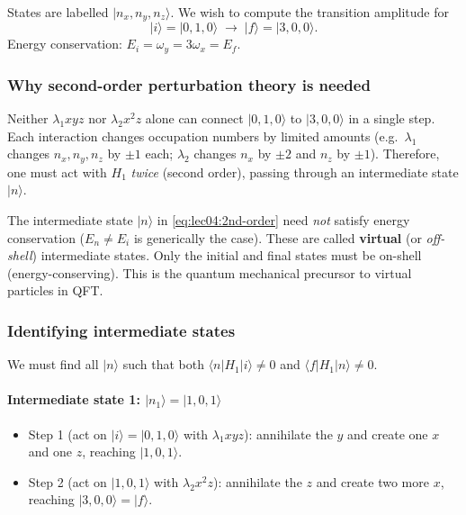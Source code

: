 States are labelled $|n_x, n_y, n_z\rangle$.  We wish to compute the transition amplitude for
\begin{equation}
  |i\rangle = |0,1,0\rangle
  \;\longrightarrow\;
  |f\rangle = |3,0,0\rangle.
  \label{eq:lec04:process}
\end{equation}
Energy conservation: $E_i = \omega_y = 3\omega_x = E_f$. \checkmark

\subsubsection*{Why second-order perturbation theory is needed}
Neither $\lambda_1 xyz$ nor $\lambda_2 x^2 z$ alone can connect $|0,1,0\rangle$ to $|3,0,0\rangle$ in a single step.  Each interaction changes occupation numbers by limited amounts (e.g.\ $\lambda_1$ changes $n_x, n_y, n_z$ by $\pm 1$ each; $\lambda_2$ changes $n_x$ by $\pm 2$ and $n_z$ by $\pm 1$).  Therefore, one must act with $H_1$ \emph{twice} (second order), passing through an intermediate state $|n\rangle$.


\begin{remark}
The intermediate state $|n\rangle$ in \eqref{eq:lec04:2nd-order} need \emph{not} satisfy energy conservation ($E_n \neq E_i$ is generically the case).  These are called \textbf{virtual} (or \emph{off-shell}) intermediate states.  Only the initial and final states must be on-shell (energy-conserving).  This is the quantum mechanical precursor to virtual particles in QFT.
\end{remark}

\subsubsection*{Identifying intermediate states}

We must find all $|n\rangle$ such that both $\langle n | H_1 | i \rangle \neq 0$ and $\langle f | H_1 | n \rangle \neq 0$.

\paragraph{Intermediate state 1: $|n_1\rangle = |1,0,1\rangle$}
\begin{itemize}
  \item Step 1 (act on $|i\rangle = |0,1,0\rangle$ with $\lambda_1 xyz$): annihilate the $y$ and create one $x$ and one $z$, reaching $|1,0,1\rangle$.
  \item Step 2 (act on $|1,0,1\rangle$ with $\lambda_2 x^2 z$): annihilate the $z$ and create two more $x$, reaching $|3,0,0\rangle = |f\rangle$.
\end{itemize}

